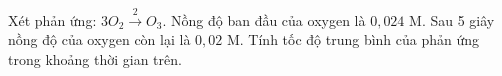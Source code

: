 \begin{bt}
	Xét phản ứng: $3O_2 \xrightarrow 2O_3$.
	Nồng độ ban đầu của oxygen là $0{,}024 \text{ M}$. Sau 5 giây nồng độ của oxygen còn lại là $0{,}02 \text{ M}$. Tính tốc độ trung bình của phản ứng trong khoảng thời gian trên.
\end{bt}

